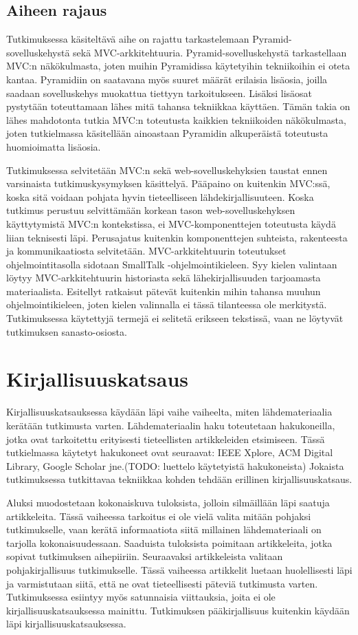 \documentclass[finnish,utf8,nonumbib,palatino,kandi]{gradu2}
\begin{document}
\subsection{Aiheen rajaus}
Tutkimuksessa käsiteltävä aihe on rajattu tarkastelemaan Pyramid-sovelluskehystä sekä MVC-arkkitehtuuria. Pyramid-sovelluskehystä
tarkastellaan MVC:n näkökulmasta, joten muihin Pyramidissa käytetyihin tekniikoihin ei oteta kantaa. Pyramidiin on saatavana myös suuret määrät erilaisia lisäosia, joilla saadaan sovelluskehys muokattua tiettyyn tarkoitukseen. Lisäksi lisäosat pystytään toteuttamaan lähes mitä tahansa tekniikkaa käyttäen. Tämän takia on lähes mahdotonta tutkia MVC:n toteutusta kaikkien tekniikoiden näkökulmasta, joten tutkielmassa käsitellään ainoastaan Pyramidin alkuperäistä toteutusta huomioimatta lisäosia.

Tutkimuksessa selvitetään MVC:n sekä web-sovelluskehyksien taustat ennen varsinaista tutkimuskysymyksen käsittelyä. Pääpaino
on kuitenkin MVC:ssä, koska sitä voidaan pohjata hyvin tieteelliseen lähdekirjallisuuteen. Koska tutkimus perustuu
selvittämään korkean tason web-sovelluskehyksen käyttytymistä MVC:n kontekstissa, ei MVC-komponenttejen toteutusta käydä liian teknisesti läpi. Perusajatus kuitenkin komponenttejen suhteista, rakenteesta ja
kommunikaatiosta selvitetään. MVC-arkkitehtuurin toteutukset ohjelmointitasolla sidotaan SmallTalk -ohjelmointikieleen. 
Syy kielen valintaan löytyy MVC-arkkitehtuurin historiasta sekä lähekirjallisuuden tarjoamasta materiaalista. Esitellyt ratkaisut
pätevät kuitenkin mihin tahansa muuhun ohjelmointikieleen, joten kielen valinnalla ei tässä tilanteessa ole merkitystä. \\
Tutkimuksessa käytettyjä termejä ei selitetä erikseen tekstissä, vaan ne löytyvät tutkimuksen sanasto-osiosta.

\section{Kirjallisuuskatsaus}
Kirjallisuuskatsauksessa käydään läpi vaihe vaiheelta, miten lähdemateriaalia kerätään
tutkimusta varten. Lähdemateriaalin haku toteutetaan hakukoneilla, jotka ovat tarkoitettu
erityisesti tieteellisten artikkeleiden etsimiseen. Tässä tutkielmassa käytetyt hakukoneet ovat seuraavat:
IEEE Xplore, ACM Digital Library, Google Scholar jne.(TODO: luettelo käytetyistä hakukoneista) Jokaista tutkimuksessa tutkittavaa
tekniikkaa kohden tehdään erillinen kirjallisuuskatsaus. 

Aluksi muodostetaan kokonaiskuva tuloksista, jolloin silmäillään läpi saatuja artikkeleita. Tässä 
vaiheessa tarkoitus ei ole vielä valita mitään pohjaksi tutkimukselle, vaan kerätä informaatiota
siitä millainen lähdemateriaali on tarjolla kokonaisuudessaan. Saaduista tuloksista poimitaan artikkeleita,
jotka sopivat tutkimuksen aihepiiriin. Seuraavaksi artikkeleista valitaan pohjakirjallisuus tutkimukselle. Tässä vaiheessa artikkelit luetaan huolellisesti
läpi ja varmistutaan siitä, että ne ovat tieteellisesti päteviä tutkimusta varten. Tutkimuksessa esiintyy myös
satunnaisia viittauksia, joita ei ole kirjallisuuskatsauksessa mainittu. Tutkimuksen pääkirjallisuus kuitenkin käydään läpi kirjallisuuskatsauksessa.
\end{document}
